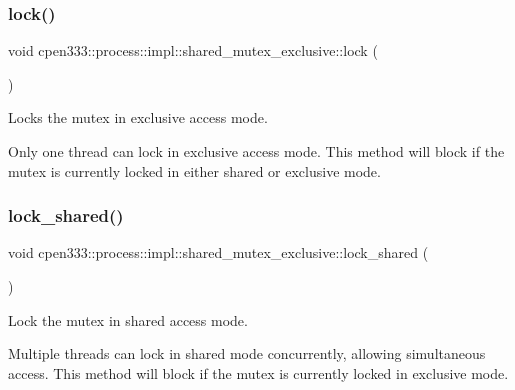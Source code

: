 \subsubsection{\texorpdfstring{lock()}{lock()}}
{\footnotesize\ttfamily void cpen333\+::process\+::impl\+::shared\+\_\+mutex\+\_\+exclusive\+::lock (\begin{DoxyParamCaption}{ }\end{DoxyParamCaption})\hspace{0.3cm}{\ttfamily [inline]}}



Locks the mutex in exclusive access mode. 

Only one thread can lock in exclusive access mode. This method will block if the mutex is currently locked in either shared or exclusive mode. \mbox{\label{classcpen333_1_1process_1_1impl_1_1shared__mutex__exclusive_ae512adfb383e28ca05d0e1e84f79a898}} 
\subsubsection{\texorpdfstring{lock\+\_\+shared()}{lock\_shared()}}
{\footnotesize\ttfamily void cpen333\+::process\+::impl\+::shared\+\_\+mutex\+\_\+exclusive\+::lock\+\_\+shared (\begin{DoxyParamCaption}{ }\end{DoxyParamCaption})\hspace{0.3cm}{\ttfamily [inline]}}



Lock the mutex in shared access mode. 

Multiple threads can lock in shared mode concurrently, allowing simultaneous access. This method will block if the mutex is currently locked in exclusive mode. \mbox{\label{classcpen333_1_1process_1_1impl_1_1shared__mutex__exclusive_aa7b41d55016b38a9d51f23d8c8468857}} 
